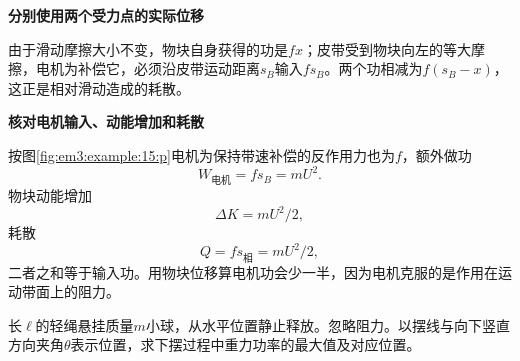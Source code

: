 \begin{solution}
\par\medskip{}\noindent\textbf{分别使用两个受力点的实际位移}\par\nobreak
由于滑动摩擦大小不变，物块自身获得的功是$fx$；皮带受到物块向左的等大摩擦，电机为补偿它，必须沿皮带运动距离$s_B$输入$fs_B$。两个功相减为$f(s_B-x)$，这正是相对滑动造成的耗散。



\par\medskip{}\noindent\textbf{核对电机输入、动能增加和耗散}\par\nobreak
按图\ref{fig:em3:example:15:p}电机为保持带速补偿的反作用力也为$f$，额外做功
\[\boxed{W_{\text{电机}}=fs_B=mU^2}.\]
物块动能增加
\[\boxed{\Delta K=mU^2/2},\]
耗散
\[\boxed{Q=fs_{\text{相}}=mU^2/2},\]
二者之和等于输入功。用物块位移算电机功会少一半，因为电机克服的是作用在运动带面上的阻力。\end{solution}
\begin{question}\begin{example}[摆球重力的最大功率]\label{em3:example:16}
长$\ell$的轻绳悬挂质量$m$小球，从水平位置静止释放。忽略阻力。以摆线与向下竖直方向夹角$\theta$表示位置，求下摆过程中重力功率的最大值及对应位置。
\end{example}
\end{question}
